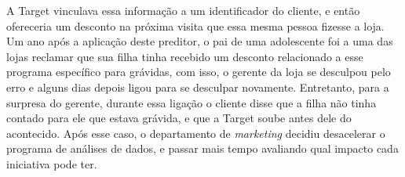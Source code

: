 \par A Target vinculava essa informação a um identificador do cliente, e então ofereceria um desconto na próxima visita que essa mesma pessoa fizesse a loja. Um ano após a aplicação deste preditor, o pai de uma adolescente foi a uma das lojas reclamar que sua filha tinha recebido um desconto relacionado a esse programa específico para grávidas, com isso, o gerente da loja se desculpou pelo erro e alguns dias depois ligou para se desculpar novamente. Entretanto, para a surpresa do gerente, durante essa ligação o cliente disse que a filha não tinha contado para ele que estava grávida, e que a Target soube antes dele do acontecido. Após esse caso, o departamento de \textit{marketing} decidiu desacelerar o programa de análises de dados, e passar mais tempo avaliando qual impacto cada iniciativa pode ter.
